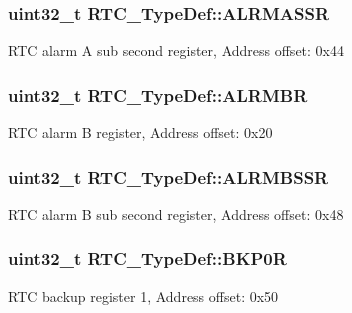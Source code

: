 \subsubsection[{\texorpdfstring{A\+L\+R\+M\+A\+S\+SR}{ALRMASSR}}]{ uint32\+\_\+t R\+T\+C\+\_\+\+Type\+Def\+::\+A\+L\+R\+M\+A\+S\+SR}\hypertarget{struct_r_t_c___type_def_ac5b2e3c0dcdcb569f3fe15dfe3794bc1}{}\label{struct_r_t_c___type_def_ac5b2e3c0dcdcb569f3fe15dfe3794bc1}
R\+TC alarm A sub second register, Address offset\+: 0x44 
\subsubsection[{\texorpdfstring{A\+L\+R\+M\+BR}{ALRMBR}}]{ uint32\+\_\+t R\+T\+C\+\_\+\+Type\+Def\+::\+A\+L\+R\+M\+BR}\hypertarget{struct_r_t_c___type_def_a9816616e1f00955c8982469d0dd9c953}{}\label{struct_r_t_c___type_def_a9816616e1f00955c8982469d0dd9c953}
R\+TC alarm B register, Address offset\+: 0x20 
\subsubsection[{\texorpdfstring{A\+L\+R\+M\+B\+S\+SR}{ALRMBSSR}}]{ uint32\+\_\+t R\+T\+C\+\_\+\+Type\+Def\+::\+A\+L\+R\+M\+B\+S\+SR}\hypertarget{struct_r_t_c___type_def_a249009cd672e7bcd52df1a41de4619e1}{}\label{struct_r_t_c___type_def_a249009cd672e7bcd52df1a41de4619e1}
R\+TC alarm B sub second register, Address offset\+: 0x48 
\subsubsection[{\texorpdfstring{B\+K\+P0R}{BKP0R}}]{ uint32\+\_\+t R\+T\+C\+\_\+\+Type\+Def\+::\+B\+K\+P0R}\hypertarget{struct_r_t_c___type_def_ab32c76ca1f3bd0f0f46d42c2dfa74524}{}\label{struct_r_t_c___type_def_ab32c76ca1f3bd0f0f46d42c2dfa74524}
R\+TC backup register 1, Address offset\+: 0x50 
